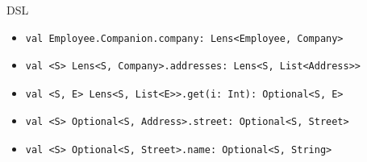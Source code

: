 \documentclass[xcolor={dvipsnames}]{beamer}
\begin{document}
\begin{frame}[fragile, t]{DSL}
    \begin{itemize}
        \item<red@1->
            \begin{lstlisting}
val Employee.Companion.company: Lens<Employee, Company>
            \end{lstlisting}

        \pause

        \item<green@1->
            \begin{lstlisting}
val <S> Lens<S, Company>.addresses: Lens<S, List<Address>>
            \end{lstlisting}

        \pause

        \item<blue@1->
            \begin{lstlisting}
val <S, E> Lens<S, List<E>>.get(i: Int): Optional<S, E>
            \end{lstlisting}            

        \pause

        \item<gray@1->
            \begin{lstlisting}
val <S> Optional<S, Address>.street: Optional<S, Street>
            \end{lstlisting}            

        \pause

        \item<purple@1->
            \begin{lstlisting}
val <S> Optional<S, Street>.name: Optional<S, String>
            \end{lstlisting}

    \end{itemize}

\end{frame}
\end{document}
